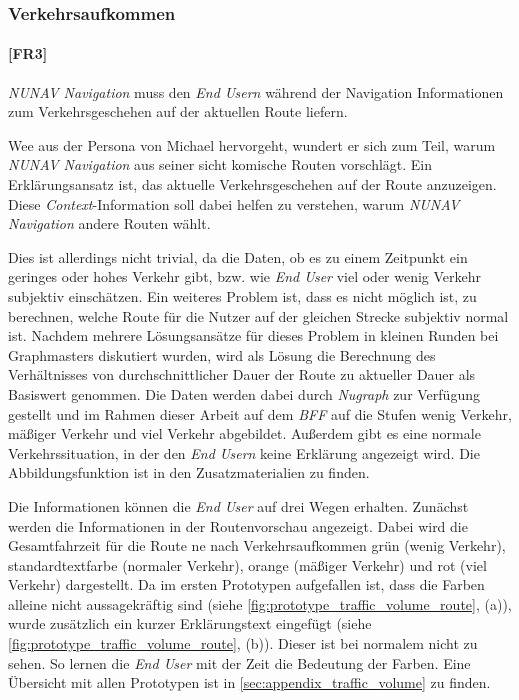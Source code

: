 \subsubsection{Verkehrsaufkommen}
\label{sec:traffic_volume_definition}

\paragraph{[FR3]} \textit{NUNAV Navigation} muss den \textit{End Usern} während der Navigation Informationen zum Verkehrsgeschehen auf der aktuellen Route liefern.

Wee aus der Persona von Michael hervorgeht, wundert er sich zum Teil, warum \textit{NUNAV Navigation} aus seiner sicht \glqq komische\grqq{} Routen vorschlägt. Ein Erklärungsansatz ist, das aktuelle Verkehrsgeschehen auf der Route anzuzeigen. Diese \textit{Context}-Information soll dabei helfen zu verstehen, warum \textit{NUNAV Navigation} andere Routen wählt. 

Dies ist allerdings nicht trivial, da die Daten, ob es zu einem Zeitpunkt ein geringes oder hohes Verkehr gibt, bzw. wie \textit{End User} viel oder wenig Verkehr subjektiv einschätzen. Ein weiteres Problem ist, dass es nicht möglich ist, zu berechnen, welche Route für die Nutzer auf der gleichen Strecke subjektiv \glqq normal\grqq{} ist. Nachdem mehrere Lösungsansätze für dieses Problem in kleinen Runden bei Graphmasters diskutiert wurden, wird als Lösung die Berechnung des Verhältnisses von durchschnittlicher Dauer der Route zu aktueller Dauer als Basiswert genommen. Die Daten werden dabei durch \textit{Nugraph} zur Verfügung gestellt und im Rahmen dieser Arbeit auf dem \textit{BFF} auf die Stufen \glqq wenig Verkehr\grqq{}, \glqq mäßiger Verkehr\grqq{} und \glqq viel Verkehr\grqq{} abgebildet. Außerdem gibt es eine \glqq normale\grqq{} Verkehrssituation, in der den \textit{End Usern} keine Erklärung angezeigt wird. Die Abbildungsfunktion ist in den Zusatzmaterialien zu finden.

Die Informationen können die \textit{End User} auf drei Wegen erhalten. Zunächst werden die Informationen in der Routenvorschau angezeigt. Dabei wird die Gesamtfahrzeit für die Route ne nach Verkehrsaufkommen grün (wenig Verkehr), standardtextfarbe (normaler Verkehr), orange (mäßiger Verkehr) und rot (viel Verkehr) dargestellt. Da im ersten Prototypen aufgefallen ist, dass die Farben alleine nicht aussagekräftig sind (siehe \autoref{fig:prototype_traffic_volume_route}, (a)), wurde zusätzlich ein kurzer Erklärungstext eingefügt (siehe \autoref{fig:prototype_traffic_volume_route}, (b)). Dieser ist bei \glqq normalem\grqq{} nicht zu sehen. So lernen die \textit{End User} mit der Zeit die Bedeutung der Farben. Eine Übersicht mit allen Prototypen ist in \autoref{sec:appendix_traffic_volume} zu finden.

